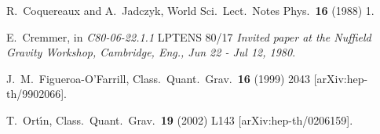 \documentclass[12pt,a4paper]{article}
\begin{document}
\begin{thebibliography}{40}
R.~Coquereaux and A.~Jadczyk,
World Sci.\ Lect.\ Notes Phys.\  {\bf 16} (1988) 1.

E.~Cremmer,
in {\it C80-06-22.1.1}
LPTENS 80/17
{\it Invited paper at the Nuffield Gravity Workshop, Cambridge, Eng., Jun 22 - Jul 12, 1980}.

J.~M.~Figueroa-O'Farrill,
Class.\ Quant.\ Grav.\  {\bf 16} (1999) 2043
[arXiv:hep-th/9902066].

T.~Ort\'{\i}n,
Class.\ Quant.\ Grav.\  {\bf 19} (2002) L143
[arXiv:hep-th/0206159].


\end{thebibliography}


\end{document}
